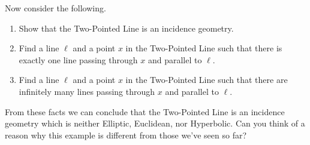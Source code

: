 \documentclass{article}
\begin{document}
Now consider the following.

\begin{enumerate}
\item Show that the Two-Pointed Line is an incidence geometry.
\item Find a line $\ell$ and a point $x$ in the Two-Pointed Line such that there is exactly one line passing through $x$ and parallel to $\ell$.
\item Find a line $\ell$ and a point $x$ in the Two-Pointed Line such that there are infinitely many lines passing through $x$ and parallel to $\ell$. 
\end{enumerate}

From these facts we can conclude that the Two-Pointed Line is an incidence geometry which is neither Elliptic, Euclidean, nor Hyperbolic. Can you think of a reason why this example is different from those we've seen so far?
\end{document}
